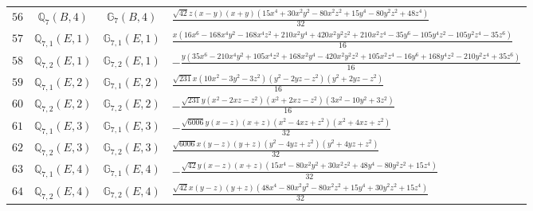 \documentclass[fleqn,8pt,landscape]{jsarticle}
\begin{document}
\begin{table}[ht!]
\begin{center}
\begin{tabular}{cccl}
$ 56 $ & $ \mathbb{Q}_{7}(B,4) $ & $ \mathbb{G}_{7}(B,4) $ & $ \frac{\sqrt{42} z \left(x - y\right) \left(x + y\right) \left(15 x^{4} + 30 x^{2} y^{2} - 80 x^{2} z^{2} + 15 y^{4} - 80 y^{2} z^{2} + 48 z^{4}\right)}{32} $ \\
$ 57 $ & $ \mathbb{Q}_{7,1}(E,1) $ & $ \mathbb{G}_{7,1}(E,1) $ & $ \frac{x \left(16 x^{6} - 168 x^{4} y^{2} - 168 x^{4} z^{2} + 210 x^{2} y^{4} + 420 x^{2} y^{2} z^{2} + 210 x^{2} z^{4} - 35 y^{6} - 105 y^{4} z^{2} - 105 y^{2} z^{4} - 35 z^{6}\right)}{16} $ \\
$ 58 $ & $ \mathbb{Q}_{7,2}(E,1) $ & $ \mathbb{G}_{7,2}(E,1) $ & $ - \frac{y \left(35 x^{6} - 210 x^{4} y^{2} + 105 x^{4} z^{2} + 168 x^{2} y^{4} - 420 x^{2} y^{2} z^{2} + 105 x^{2} z^{4} - 16 y^{6} + 168 y^{4} z^{2} - 210 y^{2} z^{4} + 35 z^{6}\right)}{16} $ \\
$ 59 $ & $ \mathbb{Q}_{7,1}(E,2) $ & $ \mathbb{G}_{7,1}(E,2) $ & $ \frac{\sqrt{231} x \left(10 x^{2} - 3 y^{2} - 3 z^{2}\right) \left(y^{2} - 2 y z - z^{2}\right) \left(y^{2} + 2 y z - z^{2}\right)}{16} $ \\
$ 60 $ & $ \mathbb{Q}_{7,2}(E,2) $ & $ \mathbb{G}_{7,2}(E,2) $ & $ - \frac{\sqrt{231} y \left(x^{2} - 2 x z - z^{2}\right) \left(x^{2} + 2 x z - z^{2}\right) \left(3 x^{2} - 10 y^{2} + 3 z^{2}\right)}{16} $ \\
$ 61 $ & $ \mathbb{Q}_{7,1}(E,3) $ & $ \mathbb{G}_{7,1}(E,3) $ & $ - \frac{\sqrt{6006} y \left(x - z\right) \left(x + z\right) \left(x^{2} - 4 x z + z^{2}\right) \left(x^{2} + 4 x z + z^{2}\right)}{32} $ \\
$ 62 $ & $ \mathbb{Q}_{7,2}(E,3) $ & $ \mathbb{G}_{7,2}(E,3) $ & $ \frac{\sqrt{6006} x \left(y - z\right) \left(y + z\right) \left(y^{2} - 4 y z + z^{2}\right) \left(y^{2} + 4 y z + z^{2}\right)}{32} $ \\
$ 63 $ & $ \mathbb{Q}_{7,1}(E,4) $ & $ \mathbb{G}_{7,1}(E,4) $ & $ - \frac{\sqrt{42} y \left(x - z\right) \left(x + z\right) \left(15 x^{4} - 80 x^{2} y^{2} + 30 x^{2} z^{2} + 48 y^{4} - 80 y^{2} z^{2} + 15 z^{4}\right)}{32} $ \\
$ 64 $ & $ \mathbb{Q}_{7,2}(E,4) $ & $ \mathbb{G}_{7,2}(E,4) $ & $ \frac{\sqrt{42} x \left(y - z\right) \left(y + z\right) \left(48 x^{4} - 80 x^{2} y^{2} - 80 x^{2} z^{2} + 15 y^{4} + 30 y^{2} z^{2} + 15 z^{4}\right)}{32} $ \\
 \hline \hline
\end{tabular}
\end{center}
\end{table}
\end{document}
